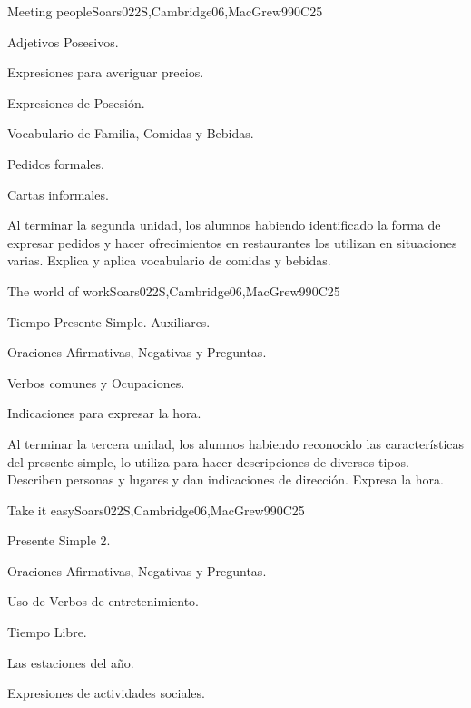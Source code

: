 \begin{syllabus}
\begin{unit}{Meeting people}{}{Soars022S,Cambridge06,MacGrew99}{0}{C25}
   \begin{topics}
      \item Adjetivos Posesivos.
      \item Expresiones para averiguar precios.
      \item Expresiones de Posesión.
      \item Vocabulario de Familia, Comidas y Bebidas.
      \item Pedidos formales.
      \item Cartas informales.
   \end{topics}

   \begin{learningoutcomes}
      \item Al terminar la segunda unidad, los alumnos habiendo identificado la forma de expresar pedidos y hacer ofrecimientos en restaurantes los utilizan en situaciones varias. Explica y aplica vocabulario de comidas y bebidas.  
   \end{learningoutcomes}

\end{unit}

\begin{unit}{The world of work}{}{Soars022S,Cambridge06,MacGrew99}{0}{C25}
   \begin{topics}
      \item Tiempo Presente Simple. Auxiliares.
      \item Oraciones Afirmativas, Negativas y Preguntas.
      \item Verbos comunes y Ocupaciones.
      \item Indicaciones para expresar la hora.
   \end{topics}

   \begin{learningoutcomes}
      \item Al terminar la tercera unidad, los alumnos habiendo reconocido las caracterí­sticas del presente simple, lo utiliza para hacer descripciones de diversos tipos. Describen personas y lugares y dan indicaciones de dirección. Expresa la hora. 
   \end{learningoutcomes}

\end{unit}

\begin{unit}{Take it easy}{}{Soars022S,Cambridge06,MacGrew99}{0}{C25}
   \begin{topics}
      \item Presente Simple 2.
      \item Oraciones Afirmativas, Negativas y Preguntas.
      \item Uso de Verbos de entretenimiento.
      \item Tiempo Libre.
      \item Las estaciones del año.
      \item Expresiones de actividades sociales.
   \end{topics}


\end{unit}
\end{syllabus}
